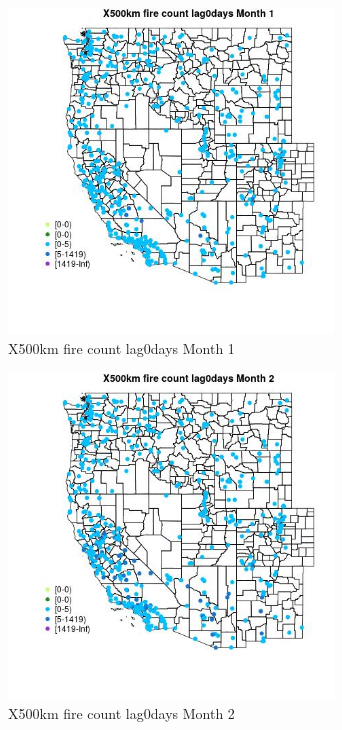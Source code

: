 \begin{figure} 
\centering  
\includegraphics[width=0.77\textwidth]{Code_Outputs/Report_ML_input_PM25_Step4_part_e_de_duplicated_aves_compiled_2019-05-14wNAs_MapObsMo1X500km_fire_count_lag0days.jpg} 
\caption{\label{fig:Report_ML_input_PM25_Step4_part_e_de_duplicated_aves_compiled_2019-05-14wNAsMapObsMo1X500km_fire_count_lag0days}X500km fire count lag0days Month 1} 
\end{figure} 
 

\begin{figure} 
\centering  
\includegraphics[width=0.77\textwidth]{Code_Outputs/Report_ML_input_PM25_Step4_part_e_de_duplicated_aves_compiled_2019-05-14wNAs_MapObsMo2X500km_fire_count_lag0days.jpg} 
\caption{\label{fig:Report_ML_input_PM25_Step4_part_e_de_duplicated_aves_compiled_2019-05-14wNAsMapObsMo2X500km_fire_count_lag0days}X500km fire count lag0days Month 2} 
\end{figure} 
 


